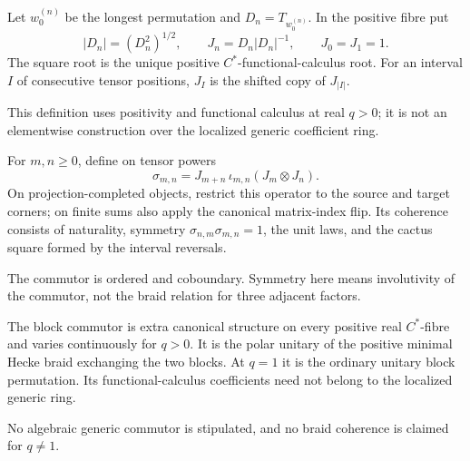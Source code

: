 \begin{definition}
Let $w_0^{(n)}$ be the longest permutation and $D_n=T_{w_0^{(n)}}$.  In the
positive fibre put
\[
 |D_n|=(D_n^2)^{1/2},\qquad J_n=D_n|D_n|^{-1},\qquad J_0=J_1=1.
\]
The square root is the unique positive $C^*$-functional-calculus root.  For
an interval $I$ of consecutive tensor positions, $J_I$ is the shifted copy
of $J_{|I|}$.
\end{definition}
\begin{scope}
This definition uses positivity and functional calculus at real $q>0$; it is
not an elementwise construction over the localized generic coefficient ring.
\end{scope}

\begin{definition}
For $m,n\geq0$, define on tensor powers
\[
 \sigma_{m,n}=J_{m+n}\,\iota_{m,n}(J_m\otimes J_n).
\]
On projection-completed objects, restrict this operator to the source and
target corners; on finite sums also apply the canonical matrix-index flip.
Its coherence consists of naturality, symmetry
$\sigma_{n,m}\sigma_{m,n}=1$, the unit laws, and the cactus square formed by
the interval reversals.
\end{definition}
\begin{scope}
The commutor is ordered and coboundary.  Symmetry here means involutivity of
the commutor, not the braid relation for three adjacent factors.
\end{scope}

\begin{definition}
The block commutor is extra canonical structure on every positive real
$C^*$-fibre and varies continuously for $q>0$.  It is the polar unitary of
the positive minimal Hecke braid exchanging the two blocks.  At $q=1$ it is
the ordinary unitary block permutation.  Its functional-calculus
coefficients need not belong to the localized generic ring.
\end{definition}
\begin{scope}
No algebraic generic commutor is stipulated, and no braid coherence is
claimed for $q\ne1$.
\end{scope}


